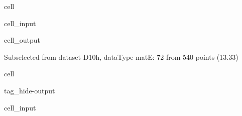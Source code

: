 \documentclass[letterpaper,table,10pt,english]{jupyterBook}
\begin{document}
\begin{sphinxuseclass}{cell}
\begin{sphinxVerbatimInput}
\begin{sphinxuseclass}{cell_input}
\end{sphinxuseclass}\end{sphinxVerbatimInput}
\begin{sphinxVerbatimOutput}

\begin{sphinxuseclass}{cell_output}
\begin{sphinxVerbatim}[commandchars=\\\{\}]
Subselected from dataset \PYGZsq{}D10h\PYGZsq{}, dataType \PYGZsq{}matE\PYGZsq{}: 72 from 540 points (13.33\PYGZpc{})
\end{sphinxVerbatim}

\end{sphinxuseclass}\end{sphinxVerbatimOutput}

\end{sphinxuseclass}
\begin{sphinxuseclass}{cell}
\begin{sphinxuseclass}{tag_hide-output}\begin{sphinxVerbatimInput}

\begin{sphinxuseclass}{cell_input}
\begin{sphinxVerbatim}[commandchars=\\\{\}]
\end{sphinxVerbatim}

\end{sphinxuseclass}\end{sphinxVerbatimInput}

\end{sphinxuseclass}
\end{sphinxuseclass}
\end{document}

